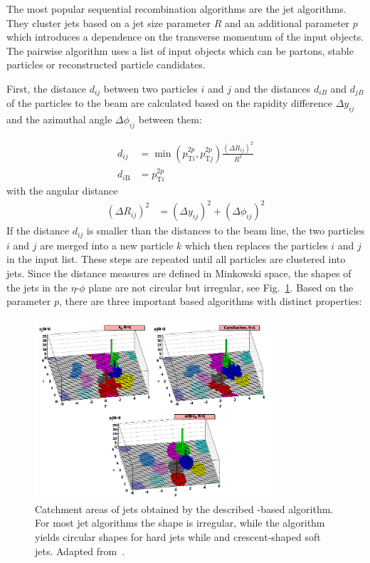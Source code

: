 The most popular sequential recombination algorithms are the \kt jet
algorithms. They cluster jets based on a jet size parameter $R$ and an
additional parameter $p$ which introduces a dependence on the transverse momentum of
the input objects. The pairwise algorithm uses a list of input objects which
can be partons, stable particles or reconstructed particle candidates.

First, the distance $d_{ij}$ between two particles $i$ and $j$ and the distances
$d_{iB}$ and $d_{jB}$ of the particles to the beam are calculated based on the
rapidity difference $\Delta y_{ij}$ and the azimuthal angle $\Delta \phi_{ij}$
between them:

\begin{align*} 
    d_{ij} &= \min(p_{\mathrm{T}i}^{2p},p_{\mathrm{T}j}^{2p})\frac{\left(\Delta
        R_{ij}\right)^2}{R^2}\\
    d_{i\mathrm{B}} &= p_{\mathrm{T}i}^{2p}
\end{align*} 
%
with the angular distance
%
\begin{align*}
    \left(\Delta R_{ij}\right)^2 &= (\Delta y_{ij})^2 + (\Delta \phi_{ij})^2
\end{align*} 
%
If the distance $d_{ij}$ is smaller than the distances to the beam line, the two
particles $i$ and $j$ are merged into a new particle $k$ which then replaces the
particles $i$ and $j$ in the input list. These steps are repeated until all
particles are clustered into jets. Since the distance measures are defined in
Minkowski space, the shapes of the jets in the $\eta$-$\phi$ plane are not circular but
irregular, see Fig.~\ref{fig:jet_shapes}. Based on the parameter $p$, there
are three important \kt based algorithms with distinct properties:

\begin{figure}[tbp]
    \centering
    \includegraphics[width=0.8\textwidth]{figures/theoretical_foundations/jet_shapes.pdf}
    \caption[Jet areas of various jet algorithms]{Catchment areas of jets
        obtained by the described \kt-based algorithm. For most jet algorithms the shape is
        irregular, while the \antikt algorithm yields circular shapes for hard
        jets while and crescent-shaped soft jets. Adapted
        from~\cite{Salam:2009jx}.}
    \label{fig:jet_shapes}
\end{figure}

